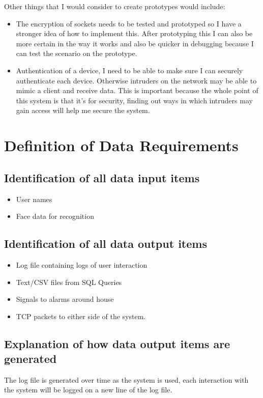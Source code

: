 \documentclass[12pt,a4paper]{report}
\begin{document}
Other things that I would consider to create prototypes would include:

\begin{itemize}
\item The encryption of sockets needs to be tested and prototyped so I have a stronger idea of how to implement this. After prototyping this I can also be more certain in the way it works and also be quicker in debugging because I can test the scenario on the prototype.
\item Authentication of a device, I need to be able to make sure I can securely authenticate each device. Otherwise intruders on the network may be able to mimic a client and receive data. This is important because the whole point of this system is that it’s for security, finding out ways in which intruders may gain access will help me secure the system.
\end{itemize}


\section[Definition of Data Requirements]{Definition of Data Requirements}
\subsection[Identification of all data input items]{Identification of all data input items}
\begin{itemize}
\item User names
\item Face data for recognition
\end{itemize}
\subsection[Identification of all data output items]{Identification of all data output items}
\begin{itemize}
\item Log file containing logs of user interaction
\item Text/CSV files from SQL Queries
\item Signals to alarms around house
\item TCP packets to either side of the system.
\end{itemize}
\subsection[Explanation of how data output items are generated]{Explanation of how data output items are generated}
The log file is generated over time as the system is used, each interaction with the system will be logged on a new line of the log file.
\end{document}
